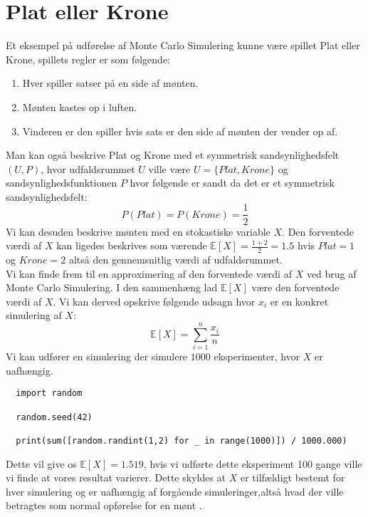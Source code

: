 \documentclass[../../SRP.tex]{subfiles}
\begin{document}
\section{Plat eller Krone}
Et eksempel på udførelse af Monte Carlo Simulering kunne være spillet Plat eller Krone, spillets regler er som følgende:
\begin{enumerate}
  \item Hver spiller satser på en side af mønten.

  \item Mønten kastes op i luften.

  \item Vinderen er den spiller hvis sats er den side af mønten der vender op af.
\end{enumerate}

Man kan også beskrive Plat og Krone med et symmetrisk sandsynlighedsfelt $(U, P)$, hvor udfaldsrummet $U$ ville være $U = \{Plat, Krone\}$ og sandsynlighedsfunktionen $P$ hvor følgende er sandt da det er et symmetrisk sandsynlighedsfelt:
\begin{equation}
  P(Plat) = P(Krone) = \frac{1}{2}
\end{equation}
Vi kan desuden beskrive mønten med en stokastiske variable $X$. Den forventede værdi af $X$ kan ligedes beskrives som værende $\mathbb{E}[X] = \frac{1 + 2}{2} = 1.5$ hvis $Plat = 1$ og $Krone = 2$ altså den gennemsnitlig værdi af udfaldsrummet. \\

Vi kan finde frem til en approximering af den forventede værdi af $X$ ved brug af Monte Carlo Simulering. I den sammenhæng lad $\mathbb{E}[X]$ være den forventede værdi af $X$. Vi kan derved opskrive følgende udsagn hvor $x_i$ er en konkret simulering af $X$:
\begin{equation}
  \mathbb{E}[X] = \sum\limits_{i=1}^n\frac{x_i}{n}
\end{equation}
Vi kan udfører en simulering der simulere $1000$ eksperimenter, hvor $X$ er uafhængig.
\begin{lstlisting}
  import random

  random.seed(42)

  print(sum([random.randint(1,2) for _ in range(1000)]) / 1000.000)
\end{lstlisting}
Dette vil give os $\mathbb{E}[X] = 1.519$, hvis vi udførte dette eksperiment 100 gange ville vi finde at vores resultat varierer. Dette skyldes at $X$ er tilfældigt bestemt for hver simulering og er uafhængig af forgående simuleringer,altså hvad der ville betragtes som normal opførelse for en mønt \cite{NM}. \\
\end{document}
